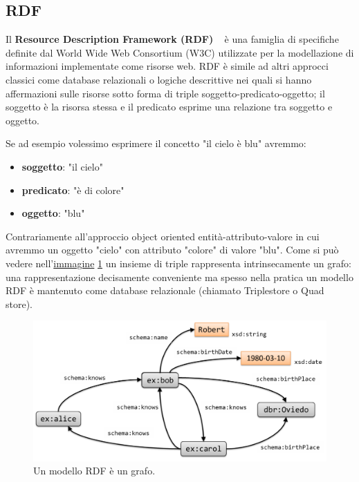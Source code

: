 \documentclass{article}
\begin{document}
\subsection{RDF} \label{sec:rdf}
Il \textbf{Resource Description Framework (RDF)} ~\cite{rdf} è una famiglia di specifiche definite dal World Wide Web Consortium (W3C) utilizzate per la modellazione di informazioni implementate come risorse web. RDF è simile ad altri approcci classici come database relazionali o logiche descrittive nei quali si hanno affermazioni sulle risorse sotto forma di triple soggetto-predicato-oggetto; il soggetto è la risorsa stessa e il predicato esprime una relazione tra soggetto e oggetto.

Se ad esempio volessimo esprimere il concetto "il cielo è blu" avremmo:
\begin{itemize}
    \item [] \textbf{soggetto}: "il cielo"
    \item [] \textbf{predicato}: "è di colore"
    \item [] \textbf{oggetto}: "blu"
\end{itemize}

Contrariamente all'approccio object oriented entità-attributo-valore in cui avremmo un oggetto "cielo" con attributo "colore" di valore "blu". Come si può vedere nell'\href{https://book.validatingrdf.com/bookHtml008.html}{immagine} \ref{fig:graph} un insieme di triple rappresenta intrinsecamente un grafo: una rappresentazione decisamente conveniente ma spesso nella pratica un modello RDF è mantenuto come database relazionale (chiamato Triplestore o Quad store).

\begin{figure}[h!t]
    \caption{Un modello RDF è un grafo.}
    \label{fig:graph}
    \includegraphics[scale=0.3]{images/RDFGraph.png}
    \centering
\end{figure}
\end{document}
